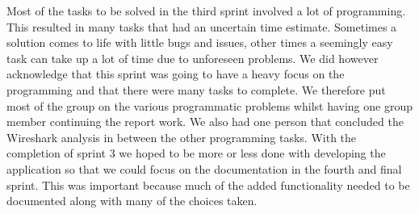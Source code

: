 Most of the tasks to be solved in the third sprint involved a lot of programming. This resulted in many tasks that had an uncertain time estimate. Sometimes a solution comes to life with little bugs and issues, other times a seemingly easy task can take up a lot of time due to unforeseen problems. We did however acknowledge that this sprint was going to have a heavy focus on the programming and that there were many tasks to complete. We therefore put most of the group on the various programmatic problems whilst having one group member continuing the report work. We also had one person that concluded the Wireshark analysis in between the other programming tasks. 
\newline
\newline
With the completion of sprint 3 we hoped to be more or less done with developing the application so that we could focus on the documentation in the fourth and final sprint. This was important because much of the added functionality needed to be documented along with many of the choices taken.
